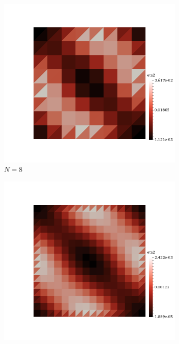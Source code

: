 \begin{figure}[h!]
  \centering
  \begin{subfigure}[b]{0.24\textwidth}
    \includegraphics[width=\textwidth,height=\textheight,keepaspectratio,height=\textheight,keepaspectratio]{figures/2_mpet/no_transfer/space/eta2_8.png}
    \caption{$N=8$}
  \end{subfigure}
  \begin{subfigure}[b]{0.24\textwidth}
    \includegraphics[width=\textwidth,height=\textheight,keepaspectratio,height=\textheight,keepaspectratio]{figures/2_mpet/no_transfer/space/eta2_16.png}

\end{subfigure}
\end{figure}
